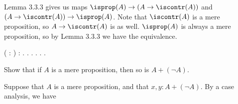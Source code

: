  \soln
Lemma 3.3.3 gives us maps $\isprop(A) \to (A \to \iscontr(A))$ and $(A
\to \iscontr(A)) \to \isprop(A)$.  Note that $\iscontr(A)$ is a mere
proposition, so $A \to \iscontr(A)$ is as well.  $\isprop(A)$ is
always a mere proposition, so by Lemma 3.3.3 we have the equivalence.
\begin{coqdoccode}
\coqdocemptyline
\coqdocnoindent
{}  ( : ) :   \coqdocnotation{\ensuremath{\eqvsym}} \coqdocnotation{(}   \coqdocnotation{)}.\coqdoceol
\coqdocnoindent
{}.\coqdoceol
\coqdocindent{1.00em}
 .\coqdoceol
\coqdocindent{1.00em}
 .\coqdoceol
\coqdocindent{1.00em}
 .\coqdoceol
\coqdocnoindent
{}.\coqdoceol
\coqdocemptyline
\end{coqdoccode}
Show that if $A$ is a mere proposition, then so is $A + (\lnot A)$.


 \soln
Suppose that $A$ is a mere proposition, and that $x, y : A + (\lnot A)$.  By a
case analysis, we have



